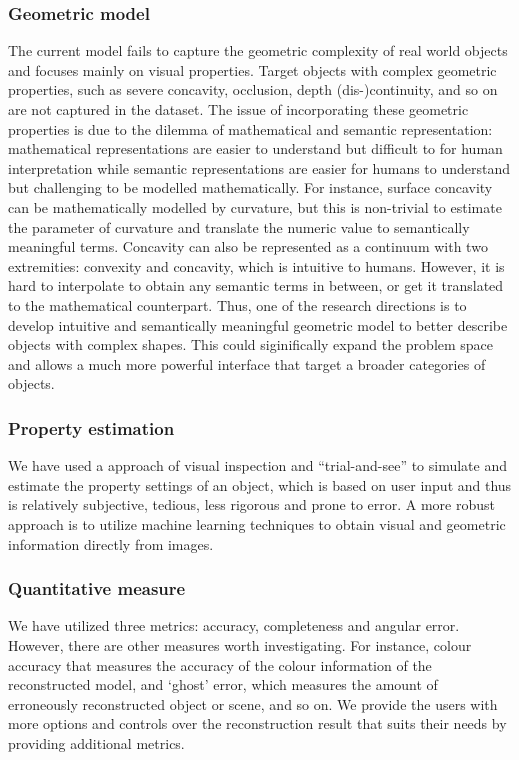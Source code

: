 \subsubsection{Geometric model}
The current model fails to capture the geometric complexity of real world objects and focuses mainly on visual properties. Target objects with complex geometric properties, such as severe concavity, occlusion, depth (dis-)continuity, and so on are not captured in the dataset. The issue of incorporating these geometric properties is due to the dilemma of mathematical and semantic representation: mathematical representations are easier to understand but difficult to for human interpretation while semantic representations are easier for humans to understand but challenging to be modelled mathematically. For instance, surface concavity can be mathematically modelled by curvature, but this is non-trivial to estimate the parameter of curvature and translate the numeric value to semantically meaningful terms. Concavity can also be represented as a continuum with two extremities: convexity and concavity, which is intuitive to humans. However, it is hard to interpolate to obtain any semantic terms in between, or get it translated to the mathematical counterpart. Thus, one of the research directions is to develop intuitive and semantically meaningful geometric model to better describe objects with complex shapes. This could siginifically expand the problem space and allows a much more powerful interface that target a broader categories of objects.

\subsubsection{Property estimation}
We have used a approach of visual inspection and ``trial-and-see'' to simulate and estimate the property settings of an object, which is based on user input and thus is relatively subjective, tedious, less rigorous and prone to error. A more robust approach is to utilize machine learning techniques to obtain visual and geometric information directly from images.

\subsubsection{Quantitative measure}
We have utilized three metrics: accuracy, completeness and angular error. However, there are other measures worth investigating. For instance, colour accuracy that measures the accuracy of the colour information of the reconstructed model, and `ghost' error, which measures the amount of erroneously reconstructed object or scene, and so on. We provide the users with more options and controls over the reconstruction result that suits their needs by providing additional metrics.

